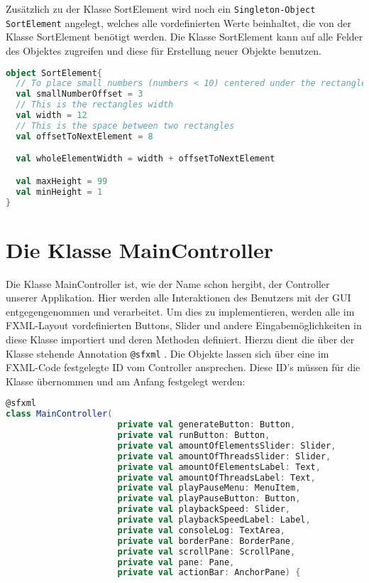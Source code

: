 Zusätzlich zu der Klasse SortElement wird noch ein \texttt{Singleton-Object} \texttt{SortElement} angelegt, welches alle vordefinierten Werte beinhaltet, die von der Klasse SortElement benötigt werden. Die Klasse SortElement kann auf alle Felder des Objektes zugreifen und diese für Erstellung neuer Objekte benutzen.

\begin{lstlisting}[language=Scala,caption=Das Singleton--Object SortElement]
object SortElement{
  // To place small numbers (numbers < 10) centered under the rectangle, this offset is needed.
  val smallNumberOffset = 3
  // This is the rectangles width
  val width = 12
  // This is the space between two rectangles
  val offsetToNextElement = 8

  val wholeElementWidth = width + offsetToNextElement

  val maxHeight = 99
  val minHeight = 1
}
\end{lstlisting}

\section{Die Klasse MainController}

Die Klasse MainController ist, wie der Name schon hergibt, der Controller unserer Applikation. Hier werden alle Interaktionen des Benutzers mit der GUI entgegengenommen und verarbeitet. Um dies zu implementieren, werden alle im FXML-Layout vordefinierten Buttons, Slider und andere Eingabemöglichkeiten in diese Klasse importiert und deren Methoden definiert. Hierzu dient die über der Klasse stehende Annotation \texttt{@sfxml} . Die Objekte lassen sich über eine im FXML-Code festgelegte ID vom Controller ansprechen. Diese ID’s müssen für die Klasse übernommen und am Anfang festgelegt werden:

\begin{lstlisting}[language=Scala,caption=Erzeugen der Elemente und Initialisierung der Anwendung durch den Benutzer]
@sfxml
class MainController(
                      private val generateButton: Button,
                      private val runButton: Button,
                      private val amountOfElementsSlider: Slider,
                      private val amountOfThreadsSlider: Slider,
                      private val amountOfElementsLabel: Text,
                      private val amountOfThreadsLabel: Text,
                      private val playPauseMenu: MenuItem,
                      private val playPauseButton: Button,
                      private val playbackSpeed: Slider,
                      private val playbackSpeedLabel: Label,
                      private val consoleLog: TextArea,
                      private val borderPane: BorderPane,
                      private val scrollPane: ScrollPane,
                      private val pane: Pane,
                      private val actionBar: AnchorPane) {
\end{lstlisting}

